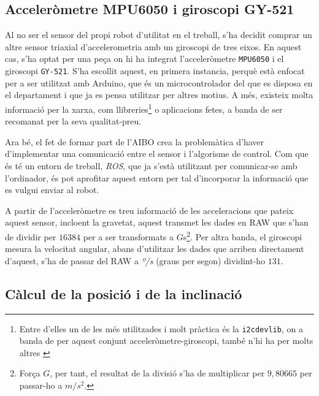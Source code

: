 \documentclass[12pt,a4paper,final,twoside]{report}
\begin{document}
\subsection{Acceleròmetre MPU6050 i giroscopi GY-521}

Al no ser el sensor del propi robot d'utilitat en el treball, s'ha decidit comprar un altre sensor triaxial d'accelerometria amb un giroscopi de tres eixos. En aquest cas, s'ha optat per una peça on hi ha integrat l'acceleròmetre \texttt{MPU6050} i el giroscopi \texttt{GY-521}. S'ha escollit aquest, en primera instancia, perquè està enfocat per a ser utilitzat amb Arduino, que és un microcontrolador del que es disposa en el departament i que ja es pensa utilitzar per altres motius. A més, existeix molta informació per la xarxa, com llibreries\footnote{Entre d'elles un de les més utilitzades i molt pràctica és la \texttt{i2cdevlib}, on a banda de per aquest conjunt acceleròmetre-giroscopi, també n'hi ha per molts altres \cite{Rowberg}} o aplicacions fetes, a banda de ser recomanat per la seva qualitat-preu.


Ara bé, el fet de formar part de l'AIBO crea la problemàtica d'haver d'implementar una comunicació entre el sensor i l'algorisme de control. Com que és té un entorn de treball, \textit{ROS}, que ja s'està utilitzant per comunicar-se amb l'ordinador, és pot aprofitar aquest entorn per tal d'incorporar la informació que es vulgui enviar al robot. 

A partir de l'acceleròmetre es treu informació de les acceleracions que pateix aquest sensor, incloent la gravetat, aquest transmet les dades en RAW que s'han de dividir per $16384$ per a ser transformats a $G$s\footnote{Força $G$, per tant, el resultat de la divisió s'ha de multiplicar per $9,80665$ per passar-ho a $m/s^2$.}. Per altra banda, el giroscopi mesura la velocitat angular, abans d'utilitzar les dades que arriben directament d'aquest, s'ha de passar del RAW a \textit{º/s} (graus per segon) dividint-ho $131$.

\subsection{Càlcul de la posició i de la inclinació}
\label{Calcul-posicio-inclinacio}
\end{document}
